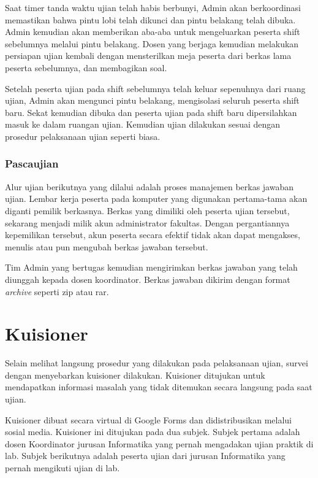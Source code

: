         Saat timer tanda waktu ujian telah habis berbunyi, Admin akan berkoordinasi memastikan bahwa pintu lobi telah dikunci dan pintu belakang telah dibuka. Admin kemudian akan memberikan aba-aba untuk mengeluarkan peserta shift sebelumnya melalui pintu belakang.
        Dosen yang berjaga kemudian melakukan persiapan ujian kembali dengan mensterilkan meja peserta dari berkas lama peserta sebelumnya, dan membagikan soal.
        
        Setelah peserta ujian pada shift sebelumnya telah keluar sepenuhnya dari ruang ujian, Admin akan mengunci pintu belakang, mengisolasi seluruh peserta shift baru. Sekat kemudian dibuka dan peserta ujian pada shift baru dipersilahkan masuk ke dalam ruangan ujian. Kemudian ujian dilakukan sesuai dengan prosedur pelaksanaan ujian seperti biasa.
    
    \subsubsection{Pascaujian}
        Alur ujian berikutnya yang dilalui adalah proses manajemen berkas jawaban ujian. Lembar kerja peserta pada komputer yang digunakan pertama-tama akan diganti pemilik berkasnya. Berkas yang dimiliki oleh peserta ujian tersebut, sekarang menjadi milik akun administrator fakultas. Dengan pergantiannya kepemilikan tersebut, akun peserta secara efektif tidak akan dapat mengakses, menulis atau pun mengubah berkas jawaban tersebut.
        
        Tim Admin yang bertugas kemudian mengirimkan berkas jawaban yang telah diunggah kepada dosen koordinator.
        Berkas jawaban dikirim dengan format \textit{archive} seperti zip atau rar.
    
\section{Kuisioner}
    Selain melihat langsung prosedur yang dilakukan pada pelaksanaan ujian, survei dengan menyebarkan kuisioner dilakukan. Kuisioner ditujukan untuk mendapatkan informasi masalah yang tidak ditemukan secara langsung pada saat ujian.
    
    Kuisioner dibuat secara virtual di Google Forms dan didistribusikan melalui sosial media. Kuisioner ini ditujukan pada dua subjek.
    Subjek pertama adalah dosen Koordinator jurusan Informatika yang pernah mengadakan ujian praktik di lab. Subjek berikutnya adalah peserta ujian dari jurusan Informatika yang pernah mengikuti ujian di lab. 
    
